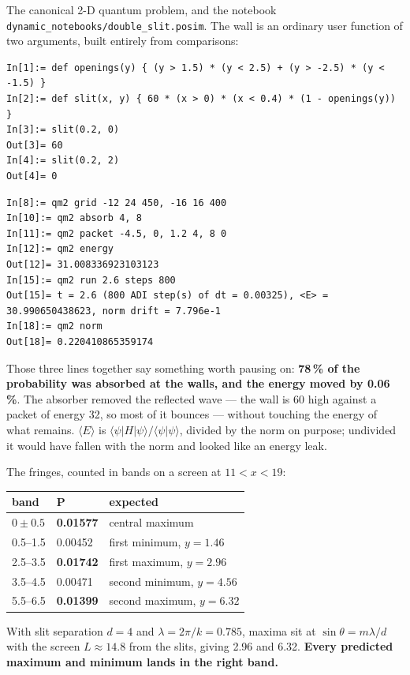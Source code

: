 \documentclass[11pt]{article}
\newcommand{\code}[1]{\texttt{#1}}
\begin{document}
The canonical 2-D quantum problem, and the notebook
\code{dynamic\_notebooks/double\_slit.posim}. The wall is an ordinary
user function of two arguments, built entirely from comparisons:

\begin{lstlisting}
In[1]:= def openings(y) { (y > 1.5) * (y < 2.5) + (y > -2.5) * (y < -1.5) }
In[2]:= def slit(x, y) { 60 * (x > 0) * (x < 0.4) * (1 - openings(y)) }
In[3]:= slit(0.2, 0)
Out[3]= 60
In[4]:= slit(0.2, 2)
Out[4]= 0
\end{lstlisting}

\begin{lstlisting}
In[8]:= qm2 grid -12 24 450, -16 16 400
In[10]:= qm2 absorb 4, 8
In[11]:= qm2 packet -4.5, 0, 1.2 4, 8 0
In[12]:= qm2 energy
Out[12]= 31.008336923103123
In[15]:= qm2 run 2.6 steps 800
Out[15]= t = 2.6 (800 ADI step(s) of dt = 0.00325), <E> = 30.990650438623, norm drift = 7.796e-1
In[18]:= qm2 norm
Out[18]= 0.220410865359174
\end{lstlisting}

Those three lines together say something worth pausing on:
\textbf{78\,\% of the probability was absorbed at the walls, and the
energy moved by 0.06\,\%}. The absorber removed the reflected wave ---
the wall is 60 high against a packet of energy 32, so most of it bounces
--- without touching the energy of what remains. $\langle E\rangle$ is
$\langle\psi|H|\psi\rangle/\langle\psi|\psi\rangle$, divided by the norm
on purpose; undivided it would have fallen with the norm and looked like
an energy leak.

The fringes, counted in bands on a screen at $11<x<19$:

\begin{center}
\begin{tabular}{lll}
\textbf{band} & \textbf{P} & \textbf{expected}\\
\hline
$0\pm0.5$ & \textbf{0.01577} & central maximum\\
0.5--1.5 & 0.00452 & first minimum, $y=1.46$\\
2.5--3.5 & \textbf{0.01742} & first maximum, $y=2.96$\\
3.5--4.5 & 0.00471 & second minimum, $y=4.56$\\
5.5--6.5 & \textbf{0.01399} & second maximum, $y=6.32$\\
\end{tabular}
\end{center}

With slit separation $d=4$ and $\lambda=2\pi/k=0.785$, maxima sit at
$\sin\theta = m\lambda/d$ with the screen $L\approx14.8$ from the slits,
giving 2.96 and 6.32. \textbf{Every predicted maximum and minimum lands
in the right band.}
\end{document}
